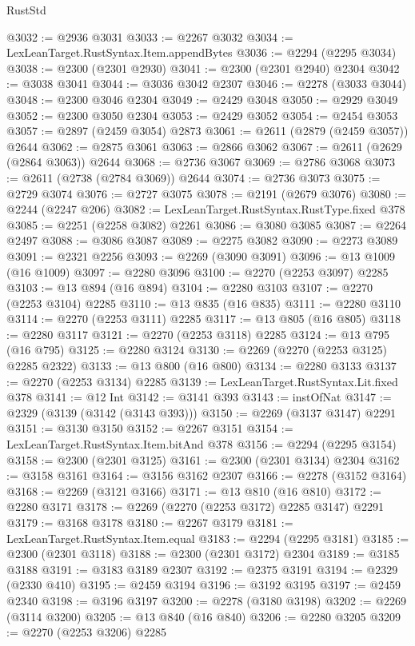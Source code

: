\begin{lexlean}{RustStd}
\begin{coremodule}
@3032 := @2936 @3031
@3033 := @2267 @3032
@3034 := LexLeanTarget.RustSyntax.Item.appendBytes
@3036 := @2294 (@2295 @3034)
@3038 := @2300 (@2301 @2930)
@3041 := @2300 (@2301 @2940) @2304
@3042 := @3038 @3041
@3044 := @3036 @3042 @2307
@3046 := @2278 (@3033 @3044)
@3048 := @2300 @3046 @2304
@3049 := @2429 @3048
@3050 := @2929 @3049
@3052 := @2300 @3050 @2304
@3053 := @2429 @3052
@3054 := @2454 @3053
@3057 := @2897 (@2459 @3054) @2873
@3061 := @2611 (@2879 (@2459 @3057)) @2644
@3062 := @2875 @3061
@3063 := @2866 @3062
@3067 := @2611 (@2629 (@2864 @3063)) @2644
@3068 := @2736 @3067
@3069 := @2786 @3068
@3073 := @2611 (@2738 (@2784 @3069)) @2644
@3074 := @2736 @3073
@3075 := @2729 @3074
@3076 := @2727 @3075
@3078 := @2191 (@2679 @3076)
@3080 := @2244 (@2247 @206)
@3082 := LexLeanTarget.RustSyntax.RustType.fixed @378
@3085 := @2251 (@2258 @3082) @2261
@3086 := @3080 @3085
@3087 := @2264 @2497
@3088 := @3086 @3087
@3089 := @2275 @3082
@3090 := @2273 @3089
@3091 := @2321 @2256
@3093 := @2269 (@3090 @3091)
@3096 := @13 @1009 (@16 @1009)
@3097 := @2280 @3096
@3100 := @2270 (@2253 @3097) @2285
@3103 := @13 @894 (@16 @894)
@3104 := @2280 @3103
@3107 := @2270 (@2253 @3104) @2285
@3110 := @13 @835 (@16 @835)
@3111 := @2280 @3110
@3114 := @2270 (@2253 @3111) @2285
@3117 := @13 @805 (@16 @805)
@3118 := @2280 @3117
@3121 := @2270 (@2253 @3118) @2285
@3124 := @13 @795 (@16 @795)
@3125 := @2280 @3124
@3130 := @2269 (@2270 (@2253 @3125) @2285 @2322)
@3133 := @13 @800 (@16 @800)
@3134 := @2280 @3133
@3137 := @2270 (@2253 @3134) @2285
@3139 := LexLeanTarget.RustSyntax.Lit.fixed @378
@3141 := @12 Int
@3142 := @3141 @393
@3143 := instOfNat
@3147 := @2329 (@3139 (@3142 (@3143 @393)))
@3150 := @2269 (@3137 @3147) @2291
@3151 := @3130 @3150
@3152 := @2267 @3151
@3154 := LexLeanTarget.RustSyntax.Item.bitAnd @378
@3156 := @2294 (@2295 @3154)
@3158 := @2300 (@2301 @3125)
@3161 := @2300 (@2301 @3134) @2304
@3162 := @3158 @3161
@3164 := @3156 @3162 @2307
@3166 := @2278 (@3152 @3164)
@3168 := @2269 (@3121 @3166)
@3171 := @13 @810 (@16 @810)
@3172 := @2280 @3171
@3178 := @2269 (@2270 (@2253 @3172) @2285 @3147) @2291
@3179 := @3168 @3178
@3180 := @2267 @3179
@3181 := LexLeanTarget.RustSyntax.Item.equal
@3183 := @2294 (@2295 @3181)
@3185 := @2300 (@2301 @3118)
@3188 := @2300 (@2301 @3172) @2304
@3189 := @3185 @3188
@3191 := @3183 @3189 @2307
@3192 := @2375 @3191
@3194 := @2329 (@2330 @410)
@3195 := @2459 @3194
@3196 := @3192 @3195
@3197 := @2459 @2340
@3198 := @3196 @3197
@3200 := @2278 (@3180 @3198)
@3202 := @2269 (@3114 @3200)
@3205 := @13 @840 (@16 @840)
@3206 := @2280 @3205
@3209 := @2270 (@2253 @3206) @2285

\end{coremodule}
\end{lexlean}
